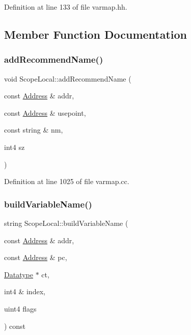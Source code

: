 Definition at line 133 of file varmap.\+hh.



\subsection{Member Function Documentation}
\mbox{\label{class_scope_local_a288f953a04ec97281b8995d5559a6874}} 
\subsubsection{\texorpdfstring{addRecommendName()}{addRecommendName()}}
{\footnotesize\ttfamily void Scope\+Local\+::add\+Recommend\+Name (\begin{DoxyParamCaption}\item[{const \mbox{\hyperlink{class_address}{Address}} \&}]{addr,  }\item[{const \mbox{\hyperlink{class_address}{Address}} \&}]{usepoint,  }\item[{const string \&}]{nm,  }\item[{int4}]{sz }\end{DoxyParamCaption})}



Definition at line 1025 of file varmap.\+cc.

\mbox{\label{class_scope_local_a7c86528490f519a64d44ae6dc8438393}} 
\subsubsection{\texorpdfstring{buildVariableName()}{buildVariableName()}}
{\footnotesize\ttfamily string Scope\+Local\+::build\+Variable\+Name (\begin{DoxyParamCaption}\item[{const \mbox{\hyperlink{class_address}{Address}} \&}]{addr,  }\item[{const \mbox{\hyperlink{class_address}{Address}} \&}]{pc,  }\item[{\mbox{\hyperlink{class_datatype}{Datatype}} $\ast$}]{ct,  }\item[{int4 \&}]{index,  }\item[{uint4}]{flags }\end{DoxyParamCaption}) const\hspace{0.3cm}{\ttfamily [virtual]}}



